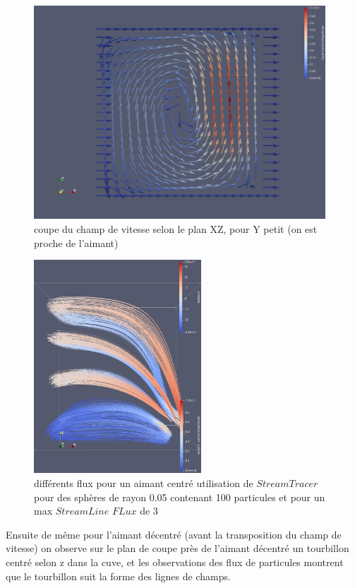 \documentclass[a4paper,12pt,titlepage]{report}
\begin{document}
\begin{onehalfspace}
\begin{figure}[!h]
\begin{center} 
\includegraphics[height = 8cm, keepaspectratio]{graphes/Paraview/coupe_aimant_decentre.png} 
\caption{\label{figure 35}coupe du champ de vitesse selon le plan XZ, pour Y petit (on est proche de l'aimant)}
\end{center}
\end{figure}


\begin{figure}[!h]
\begin{center} 
\includegraphics[height = 8cm, keepaspectratio]{graphes/Paraview/differents_flux_decentre_100pt_lenght4_rad05.png} 
\caption{\label{figure 36 }  différents flux pour un aimant centré utilisation de $StreamTracer$pour des sphères de rayon 0.05 contenant 100 particules et pour un max $StreamLine$ $FLux$ de 3}
\end{center}
\end{figure}

Ensuite de même pour l'aimant décentré (avant la transposition du champ de vitesse) on observe
sur le plan de coupe près de l'aimant décentré un tourbillon centré selon z dans la cuve, et les observations des flux de particules montrent que le tourbillon suit la forme des lignes de champs. \\




\end{onehalfspace}
\end{document}
